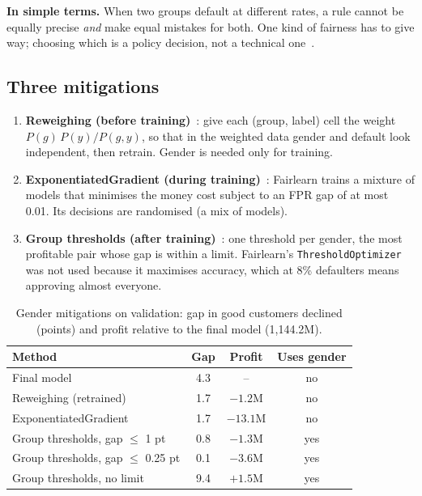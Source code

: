 \documentclass[conference,10pt]{IEEEtran}
\newcommand{\simple}[1]{\par\smallskip\noindent\colorbox{gray!13}{\parbox{\dimexpr\columnwidth-2\fboxsep\relax}{\small\textbf{In simple terms.} #1}}\par\smallskip}
\begin{document}
\simple{When two groups default at different rates, a rule cannot be equally precise
\emph{and} make equal mistakes for both. One kind of fairness has to give way; choosing which is
a policy decision, not a technical one~\cite{kleinberg2017}.}

\subsection{Three mitigations}
\begin{enumerate}
\item \textbf{Reweighing (before training)}~\cite{kamiran2012}: give each (group, label) cell
the weight $P(g)\,P(y)/P(g,y)$, so that in the weighted data gender and default look
independent, then retrain. Gender is needed only for training.
\item \textbf{ExponentiatedGradient (during training)}~\cite{agarwal2018}: Fairlearn trains a
mixture of models that minimises the money cost subject to an FPR gap of at most 0.01. Its
decisions are randomised (a mix of models).
\item \textbf{Group thresholds (after training)}~\cite{hardt2016}: one threshold per gender,
the most profitable pair whose gap is within a limit. Fairlearn's \texttt{ThresholdOptimizer} was
not used because it maximises accuracy, which at 8\% defaulters means approving almost
everyone.
\end{enumerate}

\begin{table}[t]
\centering\small
\caption{Gender mitigations on validation: gap in good customers declined (points) and profit relative to the final model (1,144.2M).}
\label{tab:fair}
\setlength{\tabcolsep}{4pt}
\begin{tabular}{@{}lccc@{}}
\toprule
Method & Gap & Profit & Uses gender \\
\midrule
Final model & 4.3 & -- & no \\
Reweighing (retrained) & 1.7 & $-1.2$M & no \\
ExponentiatedGradient & 1.7 & $-13.1$M & no \\
Group thresholds, gap $\le$ 1 pt & 0.8 & $-1.3$M & yes \\
Group thresholds, gap $\le$ 0.25 pt & 0.1 & $-3.6$M & yes \\
Group thresholds, no limit & 9.4 & $+1.5$M & yes \\
\bottomrule
\end{tabular}
\end{table}
\end{document}
